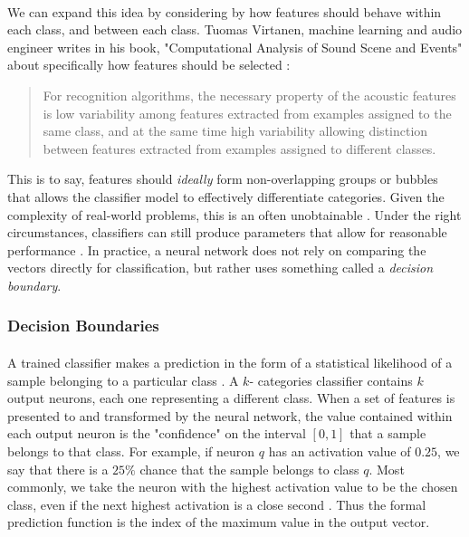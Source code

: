 \documentclass[12pt,letterpaper]{article}
\begin{document}
\paragraph*{}We can expand this idea by considering by how features should behave within each class, and between each class. Tuomas Virtanen, machine learning and audio engineer writes in his book, "Computational Analysis of Sound Scene and Events" about specifically how features should be selected \cite{Virtanen}:
\begin{quote}
For recognition algorithms, the necessary property of the acoustic features is low variability among features extracted from examples assigned to the same class, and at the same time high variability allowing distinction between features extracted from examples assigned to different classes.
\end{quote}
This is to say, features should \textit{ideally} form non-overlapping groups or bubbles that allows the classifier model to effectively differentiate categories. Given the complexity of real-world problems, this is an often unobtainable \cite{Goodfellow,James}. Under the right circumstances, classifiers can still produce parameters that allow for reasonable performance \cite{Geron,Loy}. In practice, a neural network does not rely on comparing the vectors directly for classification, but rather uses something called a \textit{decision boundary}.


\subsubsection{Decision Boundaries}
\label{subsubsec-Decision}

\paragraph*{}A trained classifier makes a prediction in the form of a statistical likelihood of a sample belonging to a particular class \cite{Goodfellow,James}. A $k$- categories classifier contains $k$ output neurons, each one representing a different class. When a set of features is presented to and transformed by the neural network, the value contained within each output neuron is the "confidence" on the interval $[0,1]$ that a sample belongs to that class. For example, if neuron $q$ has an activation value of $0.25$, we say that there is a $25\%$ chance that the sample belongs to class $q$. Most commonly, we take the neuron with the highest activation value to be the chosen class, even if the next highest activation is a close second \cite{Loy}. Thus the formal prediction function is the index of the maximum value in the output vector.
\end{document}
